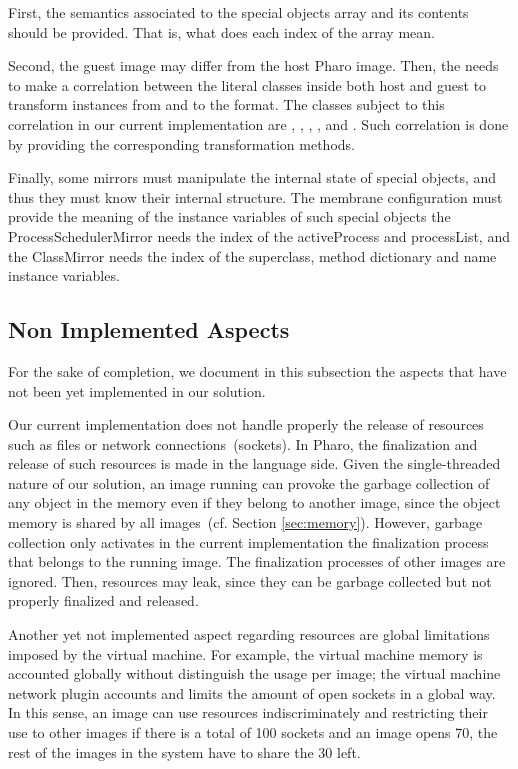\begin{description}
	First, the semantics associated to the special objects array and its contents should be provided. That is, what does each index of the array mean.
	
	Second, the guest image may differ from the host Pharo image. Then, the \objectspace needs to make a correlation between the literal classes inside both host and guest to transform instances from and to the \objectspace format. The classes subject to this correlation in our current implementation are , , , ,  and . Such correlation is done by providing the corresponding transformation methods.
	
	Finally, some mirrors must manipulate the internal state of special objects, and thus they must know their internal structure. The membrane configuration must provide the meaning of the instance variables of such special objects \ie the ProcessSchedulerMirror needs the index of the activeProcess and processList, and the ClassMirror needs the index of the superclass, method dictionary and name instance variables.
\end{description}

\subsection{Non Implemented Aspects} \label{sec:not_yet_implemented}
 
 For the sake of completion, we document in this subsection the aspects that have not been yet implemented in our solution.
 
Our current implementation does not handle properly the release of resources such as files or network connections~(sockets). In Pharo, the finalization and release of such resources is made in the language side. Given the single-threaded nature of our solution, an image running can provoke the garbage collection of any object in the memory even if they belong to another image, since the object memory is shared by all images~(cf. Section \ref{sec:memory}). However, garbage collection only activates in the current implementation the finalization process that belongs to the running image. The finalization processes of other images are ignored. Then, resources may leak, since they can be garbage collected but not properly finalized and released.

Another yet not implemented aspect regarding resources are global limitations imposed by the virtual machine. For example, the virtual machine memory is accounted globally without distinguish the usage per image; the virtual machine network plugin accounts and limits the amount of open sockets in a global way. In this sense, an image can use resources indiscriminately and restricting their use to other images \ie if there is a total of 100 sockets and an image opens 70, the rest of the images in the system have to share the 30 left.  

